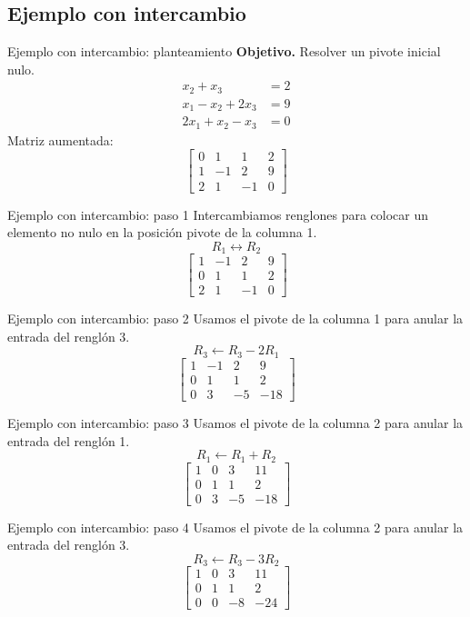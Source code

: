 \documentclass[aspectratio=169,9pt]{beamer}
\theoremstyle{remark}
\begin{document}
\subsection{Ejemplo con intercambio}
\begin{frame}[t]{Ejemplo con intercambio: planteamiento}
\textbf{Objetivo.} Resolver un pivote inicial nulo.
\[
\begin{aligned}
x_{2} + x_{3} &= 2\\
x_{1} - x_{2} + 2 x_{3} &= 9\\
2 x_{1} + x_{2} - x_{3} &= 0
\end{aligned}
\]
Matriz aumentada:
\[
\left[\begin{array}{ccc|c}
0 & 1 & 1 & 2\\
1 & -1 & 2 & 9\\
2 & 1 & -1 & 0
\end{array}\right]
\]
\end{frame}
\begin{frame}[t]{Ejemplo con intercambio: paso 1}
Intercambiamos renglones para colocar un elemento no nulo en la posición pivote de la columna 1.
\[
R_{1}\leftrightarrow R_{2}
\]
\[
\left[\begin{array}{ccc|c}
1 & -1 & 2 & 9\\
0 & 1 & 1 & 2\\
2 & 1 & -1 & 0
\end{array}\right]
\]
\end{frame}
\begin{frame}[t]{Ejemplo con intercambio: paso 2}
Usamos el pivote de la columna 1 para anular la entrada del renglón 3.
\[
R_{3}\leftarrow R_{3}-2R_{1}
\]
\[
\left[\begin{array}{ccc|c}
1 & -1 & 2 & 9\\
0 & 1 & 1 & 2\\
0 & 3 & -5 & -18
\end{array}\right]
\]
\end{frame}
\begin{frame}[t]{Ejemplo con intercambio: paso 3}
Usamos el pivote de la columna 2 para anular la entrada del renglón 1.
\[
R_{1}\leftarrow R_{1}+R_{2}
\]
\[
\left[\begin{array}{ccc|c}
1 & 0 & 3 & 11\\
0 & 1 & 1 & 2\\
0 & 3 & -5 & -18
\end{array}\right]
\]
\end{frame}
\begin{frame}[t]{Ejemplo con intercambio: paso 4}
Usamos el pivote de la columna 2 para anular la entrada del renglón 3.
\[
R_{3}\leftarrow R_{3}-3R_{2}
\]
\[
\left[\begin{array}{ccc|c}
1 & 0 & 3 & 11\\
0 & 1 & 1 & 2\\
0 & 0 & -8 & -24
\end{array}\right]
\]
\end{frame}
\end{document}
